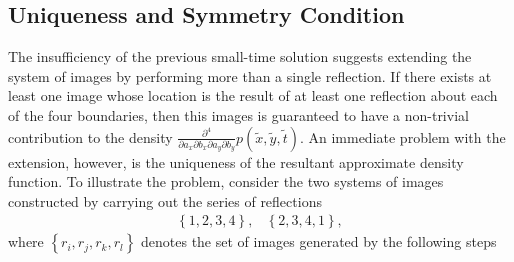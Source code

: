 \subsection{Uniqueness and Symmetry Condition}
The insufficiency of the previous small-time solution suggests
extending the system of images by performing more than a single
reflection. If there exists at least one image whose location is the
result of at least one reflection about each of the four boundaries,
then this images is guaranteed to have a non-trivial contribution to
the density
$\frac{\partial^4}{\partial a_x \partial b_x \partial a_y \partial
  b_y} p(\tilde{x}, \tilde{y}, \tilde{t})$. An immediate problem with
the extension, however, is the uniqueness of the resultant approximate
density function. To illustrate the problem, consider the two systems
of images constructed by carrying out the series of reflections
\begin{align*}
  & \left\{ 1,2,3,4 \right\}, & \left\{ 2,3,4,1 \right\}, &
\end{align*}
where $\left\{ r_i, r_j, r_k, r_l \right\}$ denotes the set of images
generated by the following steps
